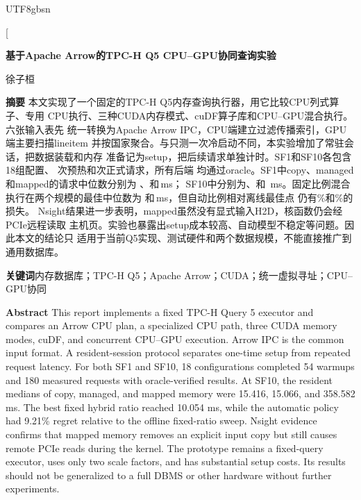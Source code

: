 \documentclass[10.5pt,compsoc]{CjC}
\begin{document}
\begin{CJK*}{UTF8}{gbsn}

\twocolumn[
\begin{center}
{\bfseries 基于Apache Arrow的TPC-H Q5 CPU--GPU协同查询实验\par}
\vspace{4mm}
{徐子桓\par}
\vspace{4mm}
\begin{minipage}{0.94\textwidth}
\sloppy
\textbf{摘\quad 要}\quad
本文实现了一个固定的TPC-H Q5内存查询执行器，用它比较CPU列式算子、专用
CPU执行、三种CUDA内存模式、cuDF算子库和CPU--GPU混合执行。六张输入表先
统一转换为Apache Arrow IPC，CPU端建立过滤传播索引，GPU端主要扫描lineitem
并按国家聚合。与只测一次冷启动不同，本实验增加了常驻会话，把数据装载和内存
准备记为setup，把后续请求单独计时。SF1和SF10各包含18组配置、
\VSevenSfOneWarmupRuns 次预热和\VSevenSfOneMeasuredRuns 次正式请求，所有后端
均通过oracle。SF1中copy、managed和mapped的请求中位数分别为
\SfOneGpuCopyMedian、\SfOneGpuManagedMedian 和\SfOneGpuMappedMedian\,ms；
SF10中分别为\SfTenGpuCopyMedian、\SfTenGpuManagedMedian 和
\SfTenGpuMappedMedian\,ms。固定比例混合执行在两个规模的最佳中位数为
\SfOneHybridBestMedian 和\SfTenHybridBestMedian\,ms，但自动比例相对离线最佳点
仍有\SfOneHybridAutoRegretPercent\%和\SfTenHybridAutoRegretPercent\%的损失。
Nsight结果进一步表明，mapped虽然没有显式输入H2D，核函数仍会经PCIe远程读取
主机页。实验也暴露出setup成本较高、自动模型不稳定等问题。因此本文的结论只
适用于当前Q5实现、测试硬件和两个数据规模，不能直接推广到通用数据库。

\textbf{关键词}\quad 内存数据库；TPC-H Q5；Apache Arrow；CUDA；统一虚拟寻址；CPU--GPU协同
\end{minipage}
\vspace{5mm}

\begin{minipage}{0.94\textwidth}
\textbf{Abstract}\quad
This report implements a fixed TPC-H Query 5 executor and compares an Arrow
CPU plan, a specialized CPU path, three CUDA memory modes, cuDF, and concurrent
CPU--GPU execution. Arrow IPC is the common input format. A resident-session
protocol separates one-time setup from repeated request latency. For both SF1
and SF10, 18 configurations completed 54 warmups and 180 measured requests with
oracle-verified results. At SF10, the resident medians of copy, managed, and
mapped memory were 15.416, 15.066, and 358.582 ms. The best fixed hybrid ratio
reached 10.054 ms, while the automatic policy had 9.21\% regret relative to the
offline fixed-ratio sweep. Nsight evidence confirms that mapped memory removes
an explicit input copy but still causes remote PCIe reads during the kernel.
The prototype remains a fixed-query executor, uses only two scale factors, and
has substantial setup costs. Its results should not be generalized to a full
DBMS or other hardware without further experiments.


\end{minipage}
\end{center}
\end{CJK*}
\end{document}
